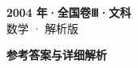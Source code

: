 \documentclass[zihao=-4, a4paper]{ctexart}
\begin{document}
\begin{center}
  {\Large\bfseries 2004 年·全国卷Ⅲ·文科}\\[4pt]
  {\large 数学 · 解析版}
\end{center}
\medskip
{}

\clearpage
{}
\begin{center}{\Large\bfseries 参考答案与详细解析}\end{center}
\medskip

\end{document}
